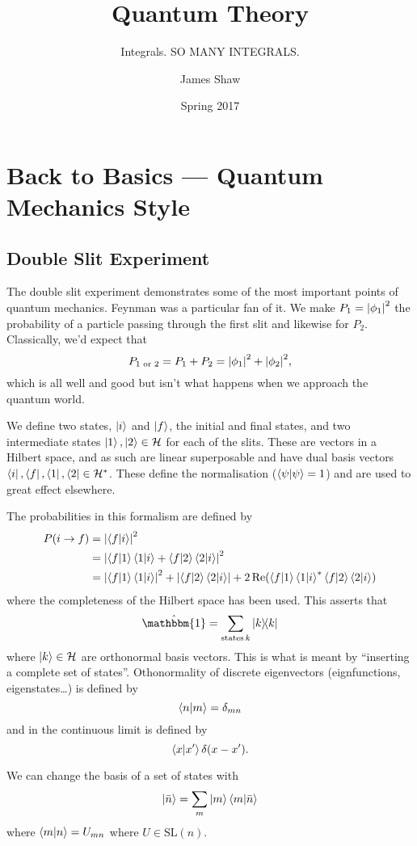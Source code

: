 \documentclass[]{scrreprt}
\title{Quantum Theory}
\subtitle{Integrals. SO MANY INTEGRALS.}
\author{James Shaw}
\date{Spring 2017}
\begin{document}


\tableofcontents %

\chapter{Back to Basics --- Quantum Mechanics Style}
\section{Double Slit Experiment}

The double slit experiment demonstrates some of the most important points of quantum mechanics.
Feynman was a particular fan of it. We make $P_1 = \abs{\phi_1}^2$ the probability of a particle passing through the first slit and likewise for $P_2$.
Classically, we'd expect that $$P_{1\text{ or }2} = P_1 + P_2 = \abs{\phi_1}^2 + \abs{\phi_2}^2,$$ which is all well and good but isn't what happens when we approach the quantum world.

We define two states, $\ket{i}$ and $\ket{f}$, the initial and final states, and two intermediate states $\ket{1}, \ket{2} \in \mathcal{H}$ for each of the slits.
These are vectors in a Hilbert space, and as such are linear superposable and have dual basis vectors $\bra{i}, \bra{f}, \bra{1}, \bra{2} \in \mathcal{H}^\ast$.
These define the normalisation ($\braket{\psi} = 1$) and are used to great effect elsewhere.

The probabilities in this formalism are defined by
\begin{align*}
  P(i \to f) &= \abs{\bra{f}\ket{i}}^2\\
   &= \abs{\bra{f}\ket{1}\bra{1}\ket{i} + \bra{f}\ket{2}\bra{2}\ket{i}}^2\\
  &= \abs{\bra{f}\ket{1}\bra{1}\ket{i}}^2 + \abs{\bra{f}\ket{2}\bra{2}\ket{i}} + 2 \Re(\bra{f}\ket{1}\bra{1}\ket{i}^\ast \bra{f}\ket{2}\bra{2}\ket{i})
\end{align*}
where the completeness of the Hilbert space has been used.
This asserts that \[ \hat{\mathbbm{1}} = \sum_{\text{states}\, k} \dyad{k}\] where \( \ket{k}\in\mathcal{H} \) are orthonormal basis vectors.
This is what is meant by ``inserting a complete set of states''.
Othonormality of discrete eigenvectors (eignfunctions, eigenstates\ldots) is defined by \[ \braket{n}{m} = \delta_{mn}\] and in the continuous limit is defined by \[\braket{x}{x^\prime} \delta(x-x^\prime).\]

We can change the basis of a set of states with \[\ket{\bar{n}} = \sum_{m} \ket{m}\braket{m}{\bar{n}} \] where \(\braket{m}{n} = U_{mn}\) where $U \in \mathrm{SL}(n)$.
\end{document}
